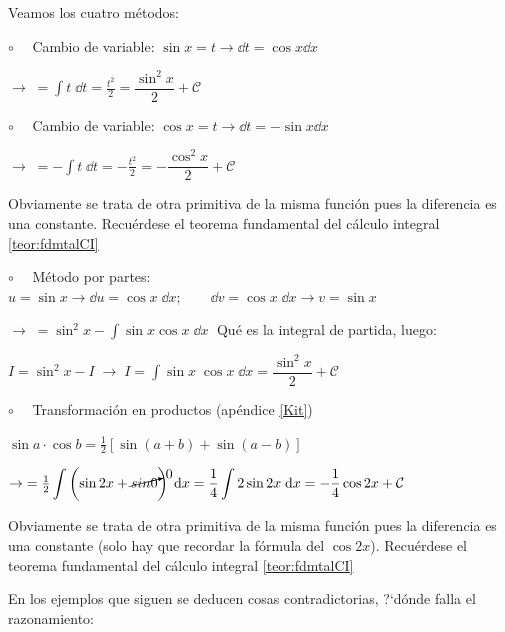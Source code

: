 {\begin{proofw}\renewcommand{\qedsymbol}{$\diamond$}	 

Veamos los cuatro métodos:

\vspace{3mm}

$\circ \quad$ Cambio de variable: $\sin x = t \to \dd t= \cos x \dd x$	

$\to \; = \displaystyle \int t \; \dd t = \frac {t^2}{2}= \dfrac {\sin^2 x}{2} + \mathcal C$

\vspace{3mm} 
$\circ \quad$ Cambio de variable: $\cos x = t \to \dd t= -\sin x \dd x$	

$\to \; = \displaystyle - \int t\; \dd t = -\frac {t^2}{2}= -\dfrac {\cos^2 x}{2}+ \mathcal C$

\textcolor{gris}{Obviamente se trata de otra primitiva de la misma función pues la diferencia es una constante. Recuérdese el teorema fundamental del cálculo integral \ref{teor:fdmtalCI}} 

\vspace{3mm} 
$\circ \quad$ Método por partes: $u=\sin x \to \dd u = \cos x \; \dd x ; \qquad \dd v= \cos x \; \dd x \to v= \sin x $

$\to\; =\displaystyle \sin^2 x - \int \sin x \cos x \; \dd x\; $ Qué es la integral de partida, luego:

$I=\sin^2 x - I \; \to \; I=\displaystyle \int \sin x \; \cos x \; \dd x = \dfrac {\sin^2 x}{2} + \mathcal C$

\vspace{3mm} 
$\circ \quad$ Transformación en productos (apéndice \ref{Kit})

$\sin a \cdot \cos b = \frac 1 2 [\sin (a+b) + \sin(a-b)]$

$\to \; = \frac 1 2 \displaystyle \int \left( \sin 2x + \cancelto {0}{sin 0}  \right) \; \dd x= \frac 1 4 \int 2 \sin 2x \; \dd x=-\frac 1 4 \cos 2x +\mathcal C$

\textcolor{gris}{Obviamente se trata de otra primitiva de la misma función pues la diferencia es una constante (solo hay que recordar la fórmula del $\cos 2 x$). Recuérdese el teorema fundamental del cálculo integral \ref{teor:fdmtalCI}}

\end{proofw}




\begin{ejre}
	

 En los ejemplos que siguen se deducen cosas contradictorias, ?`dónde falla el razonamiento:


\end{ejre}}

